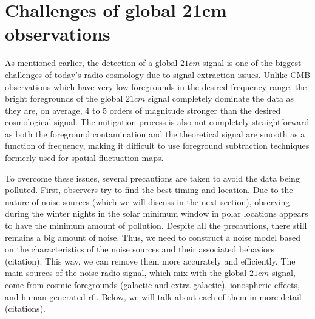 \documentclass[12pt, TexShade, letterpaper]{report}
\begin{document}
\section{Challenges of global 21cm observations}
As mentioned earlier, the detection of a global $21cm$ signal is one of the biggest challenges of today's radio cosmology due to signal extraction issues. Unlike CMB observations which have very low foregrounds in the desired frequency range, the bright foregrounds of the global $21cm$ signal completely dominate the data as they are, on average, 4 to 5 orders of magnitude stronger than the desired cosmological signal. The mitigation process is also not completely straightforward as both the foreground contamination and the theoretical signal are smooth as a function of frequency, making it difficult to use foreground subtraction techniques formerly used for spatial fluctuation maps\cite{liu2013global, thesis_moso, thesis_shedding}.\par
To overcome these issues, several precautions are taken to avoid the data being polluted. First, observers try to find the best timing and location. Due to the nature of noise sources (which we will discuss in the next section), observing during the winter nights in the solar minimum window in polar locations appears to have the minimum amount of pollution. Despite all the precautions, there still remains a big amount of noise. Thus, we need to construct a noise model based on the characteristics of the noise sources and their associated behaviors (citation). This way, we can remove them more accurately and efficiently. 
The main sources of the noise radio signal, which mix with the global $21cm$ signal, come from cosmic foregrounds (galactic and extra-galactic), ionospheric effects, and human-generated \gls{rfi}. Below, we will talk about each of them in more detail\cite{thesis_pamela, thesis_shedding} (citations).\par
\end{document}
